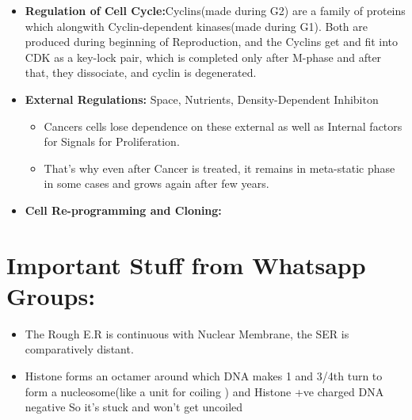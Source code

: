 \documentclass{article}
\begin{document}
\begin{itemize}
\begin{itemize}
\begin{itemize}
        \end{itemize}
    \end{itemize}
    \item \textbf{Regulation of Cell Cycle:}Cyclins(made during G2) are a family of proteins which alongwith Cyclin-dependent kinases(made during G1). Both are produced during beginning of Reproduction, and the Cyclins get and fit into CDK as a key-lock pair, which is completed only after M-phase and after that, they dissociate, and cyclin is degenerated.
    \item \textbf{External Regulations:} Space, Nutrients, Density-Dependent Inhibiton
    \begin{itemize}
        \item Cancers cells lose dependence on these external as well as Internal factors for Signals for Proliferation.
        \item That's why even after Cancer is treated, it remains in meta-static phase in some cases and grows again after few years.
    \end{itemize}
    \item \textbf{Cell Re-programming and Cloning:}
\end{itemize}

\section{Important Stuff from Whatsapp Groups:}

\begin{itemize}
  \item The Rough E.R is continuous with Nuclear Membrane, the SER is comparatively distant.
  \item Histone forms an octamer around which DNA makes 1 and 3/4th turn to form a nucleosome(like a unit for coiling ) and
  Histone +ve charged DNA negative
So it's stuck and won't get uncoiled
\end{itemize}
\end{document}

